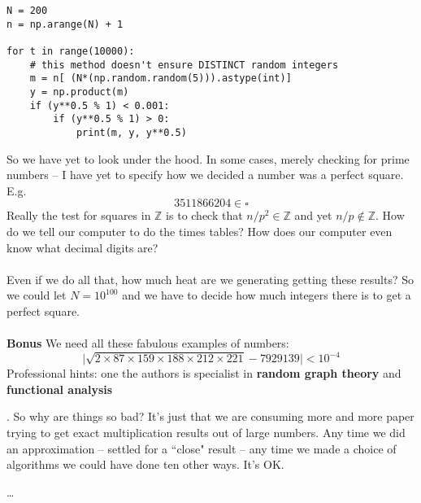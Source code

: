 \documentclass[12pt]{article}
\begin{document}
{\begin{verbatim}
N = 200
n = np.arange(N) + 1

for t in range(10000):
    # this method doesn't ensure DISTINCT random integers
    m = n[ (N*(np.random.random(5))).astype(int)]
    y = np.product(m)
    if (y**0.5 % 1) < 0.001:
        if (y**0.5 % 1) > 0:
            print(m, y, y**0.5)
\end{verbatim}
So we have yet to look under the hood.  In some cases, merely checking for prime numbers -- I have yet to specify how we decided a number was a perfect square.  E.g. 
$$ 3511866204 \in \square $$
Really the test for squares in $\mathbb{Z}$ is to check that $n/p^2 \in \mathbb{Z}$ and yet $n/p \notin \mathbb{Z}$.  How do we tell our computer to do the times tables? How does our computer even know what decimal digits are? \\ \\ Even if we do all that, how much heat are we generating getting these results?  So we could let $N = 10^{100}$ and we have to decide how much integers there is to get a perfect square. \\ \\
\textbf{Bonus} We need all these fabulous examples of numbers:
$$ \big| \sqrt{2 \times 87 \times 159 \times 188 \times 212 \times 221} - 7929139 \big| < 10^{-4} $$
Professional hints: one the authors is specialist in {\color{ blue}\textbf{random graph theory}} and {\color{blue}\textbf{functional analysis}}}.  So why are things so bad?  It's just that we are consuming more and more paper trying to get exact multiplication results out of large numbers.  Any time we did an approximation -- settled for a ``close" result -- any time we made a choice of algorithms we could have done ten other ways.  It's OK.

\vfill

\begin{thebibliography}{}

\item \dots

\end{thebibliography}
\end{document}
